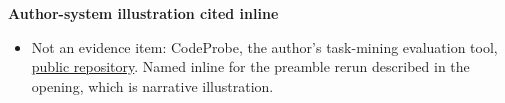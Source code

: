 \textbf{Author-system illustration cited inline}

\begin{itemize}
\tightlist
\item
  Not an evidence item: CodeProbe, the author's task-mining evaluation tool, \href{https://github.com/sjarmak/codeprobe}{public repository}. Named inline for the preamble rerun described in the opening, which is narrative illustration.
\end{itemize}
